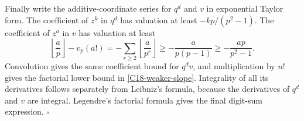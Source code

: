 Finally write the additive-coordinate series for $q^d$ and $v$ in
exponential Taylor form.  The coefficient of $z^k$ in $q^d$ has
valuation at least $-kp/(p^2-1)$.  The coefficient of $z^a$ in $v$
has valuation at least
\[
 \left\lfloor\frac ap\right\rfloor-v_p(a!)
  =-\sum_{r\geq2}\left\lfloor\frac a{p^r}\right\rfloor
  \geq-\frac{a}{p(p-1)}
  \geq-\frac{ap}{p^2-1}.
\]
Convolution gives the same coefficient bound for $q^dv$, and
multiplication by $n!$ gives the factorial lower bound in
\eqref{C18-weaker-slope}.  Integrality of all its derivatives follows
separately from Leibniz's formula, because the derivatives of $q^d$
and $v$ are integral.  Legendre's factorial formula gives the final
digit-sum expression. \hfill$\square$

